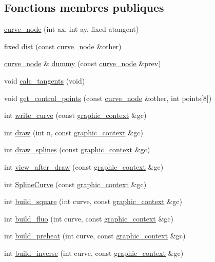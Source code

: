 \subsection*{Fonctions membres publiques}
\begin{DoxyCompactItemize}
\item 
\hyperlink{classcurve__node_add0d28f291f1cfe22e11f5436a8ba161}{curve\+\_\+node} (int ax, int ay, fixed atangent)
\item 
fixed \hyperlink{classcurve__node_a1146c27b9e6c0b3a5f6fb3faced5cea2}{dist} (const \hyperlink{classcurve__node}{curve\+\_\+node} \&other)
\item 
\hyperlink{classcurve__node}{curve\+\_\+node} \& \hyperlink{classcurve__node_a55e51b51f9b6ede537c5e11b7f234188}{dummy} (const \hyperlink{classcurve__node}{curve\+\_\+node} \&prev)
\item 
void \hyperlink{classcurve__node_a22f8acf6b081673429257867a4115c57}{calc\+\_\+tangents} (void)
\item 
void \hyperlink{classcurve__node_a14aba313f46315faae44bcca011136a9}{get\+\_\+control\+\_\+points} (const \hyperlink{classcurve__node}{curve\+\_\+node} \&other, int points\mbox{[}8\mbox{]})
\item 
int \hyperlink{classcurve__node_abc1a06d649c6dce22334da762f2955b8}{write\+\_\+curve} (const \hyperlink{classgraphic__context}{graphic\+\_\+context} \&gc)
\item 
int \hyperlink{classcurve__node_ab1db9f4ea1c53ab2eab6072b2cdc90eb}{draw} (int n, const \hyperlink{classgraphic__context}{graphic\+\_\+context} \&gc)
\item 
int \hyperlink{classcurve__node_aace217c0200a043c2d2f5f071fde8e56}{draw\+\_\+splines} (const \hyperlink{classgraphic__context}{graphic\+\_\+context} \&gc)
\item 
int \hyperlink{classcurve__node_a5c54a9611e91814177cf901636d4e8e5}{view\+\_\+after\+\_\+draw} (const \hyperlink{classgraphic__context}{graphic\+\_\+context} \&gc)
\item 
int \hyperlink{classcurve__node_afb8f3c6e6a53e062f5c2fb1cf7243969}{Spline\+Curve} (const \hyperlink{classgraphic__context}{graphic\+\_\+context} \&gc)
\item 
int \hyperlink{classcurve__node_ac1e52fe7e8f762074b804b88a1b420cf}{build\+\_\+square} (int curve, const \hyperlink{classgraphic__context}{graphic\+\_\+context} \&gc)
\item 
int \hyperlink{classcurve__node_a51a7bb24aa5832b54ec61507a556dda9}{build\+\_\+fluo} (int curve, const \hyperlink{classgraphic__context}{graphic\+\_\+context} \&gc)
\item 
int \hyperlink{classcurve__node_a6338ccf647d5f510c47702f613a3d9d2}{build\+\_\+preheat} (int curve, const \hyperlink{classgraphic__context}{graphic\+\_\+context} \&gc)
\item 
int \hyperlink{classcurve__node_a787cd6340d6b9e15da5723ed25eb18ff}{build\+\_\+inverse} (int curve, const \hyperlink{classgraphic__context}{graphic\+\_\+context} \&gc)
\end{DoxyCompactItemize}
